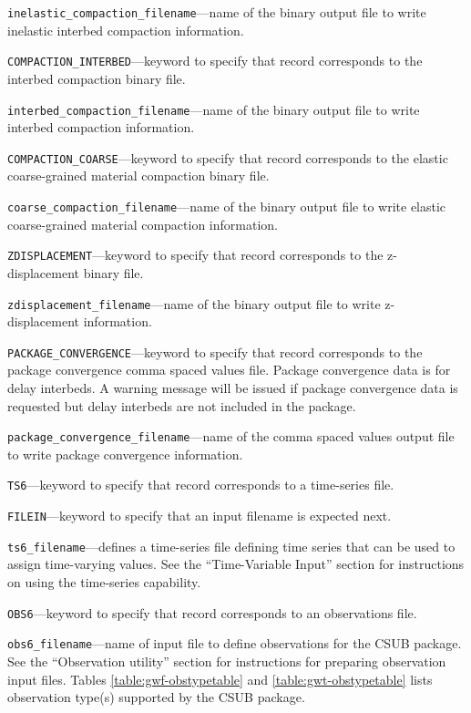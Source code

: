 \begin{description}
\item \texttt{inelastic\_compaction\_filename}---name of the binary output file to write inelastic interbed compaction information.

\item \texttt{COMPACTION\_INTERBED}---keyword to specify that record corresponds to the interbed compaction binary file.

\item \texttt{interbed\_compaction\_filename}---name of the binary output file to write interbed compaction information.

\item \texttt{COMPACTION\_COARSE}---keyword to specify that record corresponds to the elastic coarse-grained material compaction binary file.

\item \texttt{coarse\_compaction\_filename}---name of the binary output file to write elastic coarse-grained material compaction information.

\item \texttt{ZDISPLACEMENT}---keyword to specify that record corresponds to the z-displacement binary file.

\item \texttt{zdisplacement\_filename}---name of the binary output file to write z-displacement information.

\item \texttt{PACKAGE\_CONVERGENCE}---keyword to specify that record corresponds to the package convergence comma spaced values file. Package convergence data is for delay interbeds. A warning message will be issued if package convergence data is requested but delay interbeds are not included in the package.

\item \texttt{package\_convergence\_filename}---name of the comma spaced values output file to write package convergence information.

\item \texttt{TS6}---keyword to specify that record corresponds to a time-series file.

\item \texttt{FILEIN}---keyword to specify that an input filename is expected next.

\item \texttt{ts6\_filename}---defines a time-series file defining time series that can be used to assign time-varying values. See the ``Time-Variable Input'' section for instructions on using the time-series capability.

\item \texttt{OBS6}---keyword to specify that record corresponds to an observations file.

\item \texttt{obs6\_filename}---name of input file to define observations for the CSUB package. See the ``Observation utility'' section for instructions for preparing observation input files. Tables \ref{table:gwf-obstypetable} and \ref{table:gwt-obstypetable} lists observation type(s) supported by the CSUB package.

\end{description}
